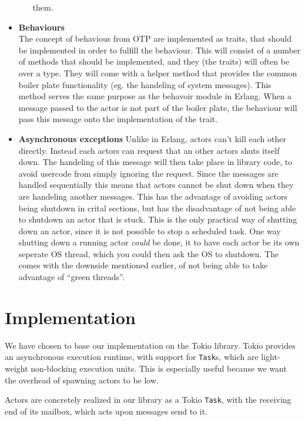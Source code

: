 \documentclass[a4paper]{article}
\begin{document}
\begin{itemize}
\begin{itemize}
    them.
  \end{itemize}
\item \textbf{Behaviours}\\
  The concept of behavious from OTP are implemented as traits, that should be
  implemented in order to fulfill the behaviour. This will consist of a number
  of methods that should be implemented, and they (the traits) will often be
  over a type. They will come with a helper method that provides the common
  boiler plate functionality (eg. the handeling of system messages). This
  method serves the same purpose as the behavoir module in Erlang. When a
  message passed to the actor is not part of the boiler plate, the behaviour
  will pass this message onto the implementation of the trait.
\item \textbf{Asynchronous exceptions}
  Unlike in Erlang, actors can't kill each other directly. Instead each
  actors can request that an other actors shuts itself down. The handeling of
  this message will then take place in library code, to avoid usercode from
  simply ignoring the request. Since the messages are handled sequentially this
  means that actors cannot be shut down when they are handeling another
  messages. This has the advantage of avoiding actors being shutdown in crital
  sections, but has the disadvantage of not being able to shutdown an actor that
  is stuck. This is the only practical way of shutting down an actor, since it
  is not possible to stop a scheduled task. One way shutting down a running
  actor \textit{could} be done, it to have each actor be its own seperate OS
  thread, which you could then ask the OS to shutdown. The comes with the
  downside mentioned earlier, of not being able to take advantage of ``green
  threads''.
\end{itemize}

\section{Implementation}
%
We have chosen to base our implementation on the Tokio library. Tokio provides an
asynchronous execution runtime, with support for \texttt{Task}s, which are
light-weight non-blocking execution units. This is especially useful because we
want the overhead of spawning actors to be low.

Actors are concretely realized in our library as a Tokio \texttt{Task}, with the
receiving end of its mailbox, which acts upon messages send to it.
\end{document}
